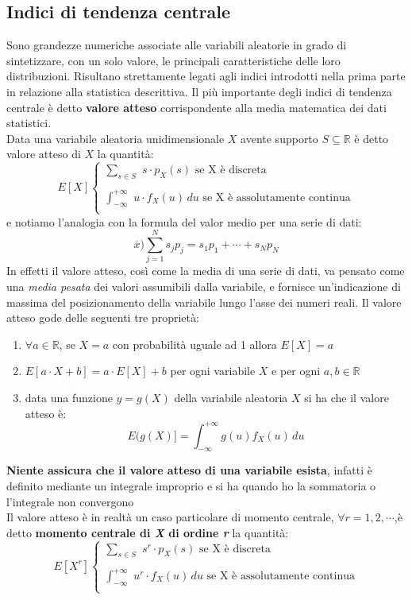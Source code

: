 \documentclass[a4paper,12pt, oneside]{book}
\begin{document}
\subsection{Indici di tendenza centrale}
Sono grandezze numeriche associate alle variabili aleatorie in grado di sintetizzare, con un solo valore, le principali caratteristiche delle loro distribuzioni. Risultano strettamente legati agli indici introdotti nella prima parte in relazione alla statistica descrittiva. Il più importante degli indici di tendenza centrale è detto \textbf{valore atteso} corrispondente alla media matematica dei dati statistici.\\
Data una variabile aleatoria unidimensionale $X$ avente supporto $S\subseteq \mathbb{R}$ è detto valore atteso di $X$ la quantità:
\[E[X]\begin{cases}
\sum_{s\in S}\,\, s\cdot p_X(s)\mbox{ se X è discreta}\\
\\
\int_{-\infty}^{+\infty}\,\, u\cdot f_X(u)\,du\mbox{ se X è assolutamente continua}\\
\end{cases}\]
e notiamo l'analogia con la formula del valor medio per una serie di dati:
\[\overline{x})\sum_{j=1}^N s_jp_j=s_1p_1+\cdots +s_Np_N\]
In effetti il valore atteso, così come la media di una serie di dati, va pensato come una \textit{media pesata} dei valori assumibili dalla variabile, e fornisce un'indicazione di
massima del posizionamento della variabile lungo l'asse dei numeri reali. Il valore atteso gode delle seguenti tre proprietà:
\begin{enumerate}
\item $\forall a\in\mathbb{R}$, se $X=a$ con probabilità uguale ad 1 allora $E[X]=a$
\item $E[a\cdot X+b]=a\cdot E[X]+b$ per ogni variabile $X$ e per ogni $a,b \in\mathbb{R}$
\item data una funzione $y=g(X)$ della variabile aleatoria $X$ si ha che il valore atteso è:
\[E(g(X)]=\int_{-\infty}^{+\infty}g(u)f_X(u)\,du\]
\end{enumerate}
\textbf{Niente assicura che il valore atteso di una variabile esista}, infatti è definito mediante un integrale improprio e si ha quando ho la sommatoria o l'integrale non convergono\\
Il valore atteso è in realtà un caso particolare di momento centrale, $\forall r = 1,2, \cdots$,è detto \textbf{momento centrale di \textit{X} di ordine \textit{r}} la quantità:
\[E[X^r]\begin{cases}
\sum_{s\in S}\,\, s^r\cdot p_X(s)\mbox{ se X è discreta}\\
\\
\int_{-\infty}^{+\infty}\,\, u^r\cdot f_X(u)\,du\mbox{ se X è assolutamente continua}\\
\end{cases}\]
\end{document}
